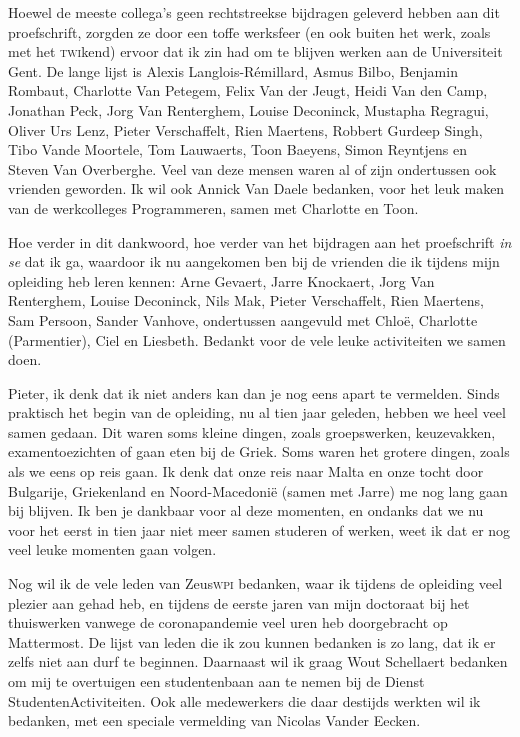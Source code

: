 \documentclass[main]{subfiles}
\begin{document}
Hoewel de meeste collega's geen rechtstreekse bijdragen geleverd hebben aan dit proefschrift, zorgden ze door een toffe werksfeer (en ook buiten het werk, zoals met het \textsc{twi}kend) ervoor dat ik zin had om te blijven werken aan de Universiteit Gent.
De lange lijst is Alexis Langlois-Rémillard, Asmus Bilbo, Benjamin Rombaut, Charlotte Van Petegem, Felix Van der Jeugt, Heidi Van den Camp, Jonathan Peck, Jorg Van Renterghem, Louise Deconinck, Mustapha Regragui, Oliver Urs Lenz, Pieter Verschaffelt, Rien Maertens, Robbert Gurdeep Singh, Tibo Vande Moortele, Tom Lauwaerts, Toon Baeyens, Simon Reyntjens en Steven Van Overberghe.
Veel van deze mensen waren al of zijn ondertussen ook vrienden geworden.
Ik wil ook Annick Van Daele bedanken, voor het leuk maken van de werkcolleges Programmeren, samen met Charlotte en Toon.

Hoe verder in dit dankwoord, hoe verder van het bijdragen aan het proefschrift \textit{in se} dat ik ga, waardoor ik nu aangekomen ben bij de vrienden die ik tijdens mijn opleiding heb leren kennen: Arne Gevaert, Jarre Knockaert, Jorg Van Renterghem, Louise Deconinck, Nils Mak, Pieter Verschaffelt, Rien Maertens, Sam Persoon, Sander Vanhove, ondertussen aangevuld met Chloë, Charlotte (Parmentier), Ciel en Liesbeth.
Bedankt voor de vele leuke activiteiten we samen doen.

Pieter, ik denk dat ik niet anders kan dan je nog eens apart te vermelden.
Sinds praktisch het begin van de opleiding, nu al tien jaar geleden, hebben we heel veel samen gedaan.
Dit waren soms kleine dingen, zoals groepswerken, keuzevakken, examentoezichten of gaan eten bij de Griek.
Soms waren het grotere dingen, zoals als we eens op reis gaan.
Ik denk dat onze reis naar Malta en onze tocht door Bulgarije, Griekenland en Noord-Macedonië (samen met Jarre) me nog lang gaan bij blijven.
Ik ben je dankbaar voor al deze momenten, en ondanks dat we nu voor het eerst in tien jaar niet meer samen studeren of werken, weet ik dat er nog veel leuke momenten gaan volgen.

Nog wil ik de vele leden van Zeus\textsc{wpi} bedanken, waar ik tijdens de opleiding veel plezier aan gehad heb, en tijdens de eerste jaren van mijn doctoraat bij het thuiswerken vanwege de coronapandemie veel uren heb doorgebracht op Mattermost.
De lijst van leden die ik zou kunnen bedanken is zo lang, dat ik er zelfs niet aan durf te beginnen.
Daarnaast wil ik graag Wout Schellaert bedanken om mij te overtuigen een studentenbaan aan te nemen bij de Dienst StudentenActiviteiten.
Ook alle medewerkers die daar destijds werkten wil ik bedanken, met een speciale vermelding van Nicolas Vander Eecken.
\end{document}
